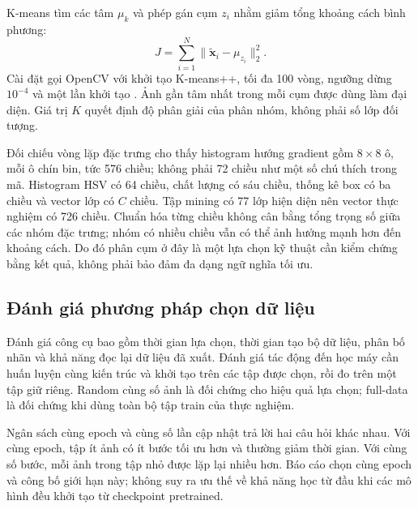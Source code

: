 K-means tìm các tâm $\mu_k$ và phép gán cụm $z_i$ nhằm giảm tổng khoảng cách bình phương:
\begin{equation}
 J=\sum_{i=1}^{N}\|\widetilde{\mathbf{x}}_i-\mu_{z_i}\|_2^2.
\end{equation}
Cài đặt gọi OpenCV với khởi tạo K-means++, tối đa 100 vòng, ngưỡng dừng $10^{-4}$ và một lần khởi tạo \citep{opencvKmeans}. Ảnh gần tâm nhất trong mỗi cụm được dùng làm đại diện. Giá trị $K$ quyết định độ phân giải của phân nhóm, không phải số lớp đối tượng.

Đối chiếu vòng lặp đặc trưng cho thấy histogram hướng gradient gồm $8\times8$ ô, mỗi ô chín bin, tức 576 chiều; không phải 72 chiều như một số chú thích trong mã. Histogram HSV có 64 chiều, chất lượng có sáu chiều, thống kê box có ba chiều và vector lớp có $C$ chiều. Tập mining có 77 lớp hiện diện nên vector thực nghiệm có 726 chiều. Chuẩn hóa từng chiều không cân bằng tổng trọng số giữa các nhóm đặc trưng; nhóm có nhiều chiều vẫn có thể ảnh hưởng mạnh hơn đến khoảng cách. Do đó phân cụm ở đây là một lựa chọn kỹ thuật cần kiểm chứng bằng kết quả, không phải bảo đảm đa dạng ngữ nghĩa tối ưu.

\subsection{Đánh giá phương pháp chọn dữ liệu}
Đánh giá công cụ bao gồm thời gian lựa chọn, thời gian tạo bộ dữ liệu, phân bố nhãn và khả năng đọc lại dữ liệu đã xuất. Đánh giá tác động đến học máy cần huấn luyện cùng kiến trúc và khởi tạo trên các tập được chọn, rồi đo trên một tập giữ riêng. Random cùng số ảnh là đối chứng cho hiệu quả lựa chọn; full-data là đối chứng khi dùng toàn bộ tập train của thực nghiệm.

Ngân sách cùng epoch và cùng số lần cập nhật trả lời hai câu hỏi khác nhau. Với cùng epoch, tập ít ảnh có ít bước tối ưu hơn và thường giảm thời gian. Với cùng số bước, mỗi ảnh trong tập nhỏ được lặp lại nhiều hơn. Báo cáo chọn cùng epoch và công bố giới hạn này; không suy ra ưu thế về khả năng học từ đầu khi các mô hình đều khởi tạo từ checkpoint pretrained.

